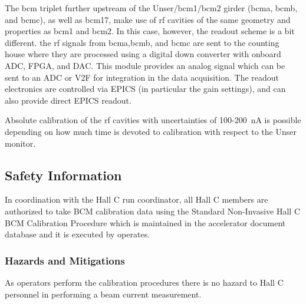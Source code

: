 {The bcm triplet further upstream of the Unser/bcm1/bcm2 girder (bcma,
bcmb, and bcmc), as well as bcm17, make use of rf cavities of the same
geometry and properties as bcm1 and bcm2. In this case, however, the
readout scheme is a bit different. the rf signals from bcma,bcmb, and
bcmc are sent to the counting house where they are processed using a
digital down converter with onboard ADC, FPGA, and DAC. This module
provides an analog signal which can be sent to an ADC or V2F for
integration in the data acquisition. The readout electronics are
controlled via EPICS (in particular the gain settings), and can also
provide direct EPICS readout.

Absolute calibration of the rf cavities with uncertainties of
100-200~nA is possible depending on how much time is devoted to
calibration with respect to the Unser monitor.

\begin{safetyen}{0}{0}
\subsection{Safety Information}
In coordination with the Hall C run coordinator, all Hall C members
are authorized to take BCM calibration data using the Standard
Non-Invasive Hall C BCM Calibration Procedure which is maintained in
the accelerator document database and it is executed by operates.


\subsubsection{Hazards and Mitigations}

As operators perform the calibration procedures there is no hazard to
Hall C personnel in performing a beam current measurement.


\end{safetyen}}
